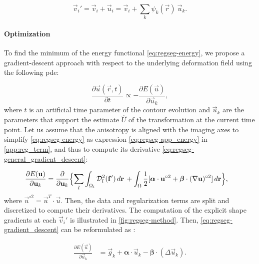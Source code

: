   \begin{equation}
  \vec{v}_i' = \vec{v}_i + \vec{u}_i = \vec{v}_i + \sum_k \psi_k(\vec{r}) \: \vec{u}_k.
  \label{eq:regseg-nodes_tfm}
  \end{equation}


\paragraph*{Optimization}
\label{sec:regseg-gradient_descent}
To find the minimum of the energy functional \eqref{eq:regseg-energy},
  we propose a gradient-descent approach with respect to the underlying
  deformation field using the following \gls*{pde}:

  \begin{equation}
  \frac{\partial \vec{u}(\vec{r},t)}{\partial t} \propto - \frac{\partial E(\vec{u})}{\partial \vec{u}_k},
  \label{eq:regseg-general_gradient_descent}
  \end{equation}
  where $t$ is an artificial time parameter of the contour
  evolution and $\vec{u}_k$ are the parameters that support the estimate
  $\hat{U}$ of the transformation at the current time point.
Let us assume that the anisotropy is aligned with the imaging axes to simplify
  \eqref{eq:regseg-energy} as expression \eqref{eq:regseg-app_energy} in \ref{app:reg_term},
  and thus to compute its derivative \eqref{eq:regseg-general_gradient_descent}:

  \begin{align}
  \frac{\partial E(\vec{u})}{\partial \vec{u}_k} &=
  \frac{ \partial }{\partial \vec{u}_k} \Big\{
  \underset{l}{\sum} \int_{\Omega_l} \mdist{f'}{l} \,d\vec{r} \, +   \int_{\Omega} \frac12 [ \boldsymbol{\alpha} \cdot \vec{u}^{\circ2}
  + \boldsymbol{\beta} \cdot (\nabla \vec{u})^{\circ2} ] \,d\vec{r}
  \Big\},
  \label{eq:regseg-gradient_descent}
  \end{align}
  where $\vec{u}^{\circ2} = \vec{u}^T \cdot \vec{u}$.
Then, the data and regularization terms are split and discretized to compute their
  derivatives.
The computation of the explicit shape gradients at each $\vec{v}_i'$ is illustrated in \autoref{fig:regseg-method}.
Then, \eqref{eq:regseg-gradient_descent} can be reformulated as :

  \begin{align}
  \frac{\partial E(\vec{u})}{\partial \vec{u}_k} &=
  \vec{g}_k  + \boldsymbol{\alpha} \cdot \vec{u}_k - \boldsymbol{\beta} \cdot (\Delta \vec{u}_k).
  \label{eq:regseg-final_gradient}
  \end{align}

